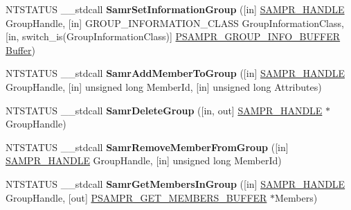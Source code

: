 \begin{DoxyCompactItemize}
\item 
\mbox{\label{interfacesamr_a1d18a9ab8bb95e75fd9d4daeb8f1b802}} 
N\+T\+S\+T\+A\+T\+US \+\_\+\+\_\+stdcall {\bfseries Samr\+Set\+Information\+Group} (\mbox{[}in\mbox{]} \hyperlink{interfacevoid}{S\+A\+M\+P\+R\+\_\+\+H\+A\+N\+D\+LE} Group\+Handle, \mbox{[}in\mbox{]} G\+R\+O\+U\+P\+\_\+\+I\+N\+F\+O\+R\+M\+A\+T\+I\+O\+N\+\_\+\+C\+L\+A\+SS Group\+Information\+Class, \mbox{[}in, switch\+\_\+is(Group\+Information\+Class)\mbox{]} \hyperlink{union___s_a_m_p_r___g_r_o_u_p___i_n_f_o___b_u_f_f_e_r}{P\+S\+A\+M\+P\+R\+\_\+\+G\+R\+O\+U\+P\+\_\+\+I\+N\+F\+O\+\_\+\+B\+U\+F\+F\+ER} \hyperlink{class_buffer}{Buffer})
\item 
\mbox{\label{interfacesamr_af00a92fac7c2c72fab0907207652fcd6}} 
N\+T\+S\+T\+A\+T\+US \+\_\+\+\_\+stdcall {\bfseries Samr\+Add\+Member\+To\+Group} (\mbox{[}in\mbox{]} \hyperlink{interfacevoid}{S\+A\+M\+P\+R\+\_\+\+H\+A\+N\+D\+LE} Group\+Handle, \mbox{[}in\mbox{]} unsigned long Member\+Id, \mbox{[}in\mbox{]} unsigned long Attributes)
\item 
\mbox{\label{interfacesamr_a6852aa54875fd41900f06a08bd1fd5e2}} 
N\+T\+S\+T\+A\+T\+US \+\_\+\+\_\+stdcall {\bfseries Samr\+Delete\+Group} (\mbox{[}in, out\mbox{]} \hyperlink{interfacevoid}{S\+A\+M\+P\+R\+\_\+\+H\+A\+N\+D\+LE} $\ast$Group\+Handle)
\item 
\mbox{\label{interfacesamr_af76647d34c8ed4ab6865db5b3df06652}} 
N\+T\+S\+T\+A\+T\+US \+\_\+\+\_\+stdcall {\bfseries Samr\+Remove\+Member\+From\+Group} (\mbox{[}in\mbox{]} \hyperlink{interfacevoid}{S\+A\+M\+P\+R\+\_\+\+H\+A\+N\+D\+LE} Group\+Handle, \mbox{[}in\mbox{]} unsigned long Member\+Id)
\item 
\mbox{\label{interfacesamr_a0363df223be0f2566c4fe017948971b9}} 
N\+T\+S\+T\+A\+T\+US \+\_\+\+\_\+stdcall {\bfseries Samr\+Get\+Members\+In\+Group} (\mbox{[}in\mbox{]} \hyperlink{interfacevoid}{S\+A\+M\+P\+R\+\_\+\+H\+A\+N\+D\+LE} Group\+Handle, \mbox{[}out\mbox{]} \hyperlink{struct___s_a_m_p_r___g_e_t___m_e_m_b_e_r_s___b_u_f_f_e_r}{P\+S\+A\+M\+P\+R\+\_\+\+G\+E\+T\+\_\+\+M\+E\+M\+B\+E\+R\+S\+\_\+\+B\+U\+F\+F\+ER} $\ast$Members)
\item 
\mbox{\label{interfacesamr_aeb5f515f25a03035adbabb66ec8d0561}} 

\end{DoxyCompactItemize}

